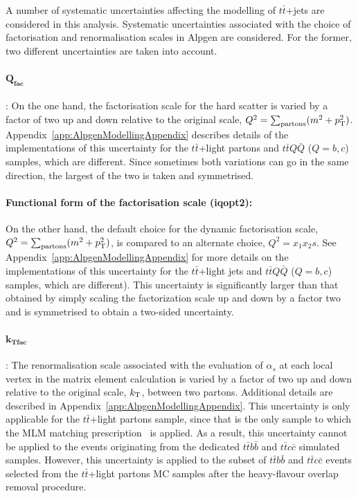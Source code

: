 A number of systematic uncertainties affecting 
the modelling of $t\bar{t}$+jets are considered
in this analysis. Systematic uncertainties associated 
with the choice of factorisation and renormalisation 
scales in {\sc Alpgen} are considered. For the former, 
two different uncertainties are taken into account.


\ifIsINT
\paragraph{$\mathbf{Q_{fac}}$}: 
\fi
On the one hand, the factorisation scale for the hard scatter is varied by a factor of two up and down relative to the
original scale, $Q^2=\sum_{\rm partons} (m^2 + \pt^2)$.
\ifIsINT 
Appendix~\ref{app:AlpgenModellingAppendix} describes details of the
implementations of this uncertainty for the $t\bar{t}$+light partons and $t\bar{t}Q\bar{Q}$ ($Q=b,c$) samples, which are different.
\fi
Since sometimes both variations can go in the same direction, the largest of the two is taken and symmetrised.
\ifIsINT
\paragraph{Functional form of the factorisation scale (iqopt2):} 
\fi
On the other hand, the default choice for the dynamic factorisation scale,
$Q^2=\sum_{\rm partons} (m^2 + \pt^2)$,  is compared to an alternate choice, $Q^2=x_1 x_2 s$.
\ifIsINT
See Appendix~\ref{app:AlpgenModellingAppendix} for more details on the implementations of this uncertainty 
for the $t\bar{t}$+light jets and $t\bar{t}Q\bar{Q}$ ($Q=b,c$) samples, which are different).
\fi
This uncertainty is significantly larger than that obtained by simply scaling the factorization scale up and down by a factor two 
and is symmetrised to obtain a two-sided uncertainty.

\ifIsINT
\paragraph{$\mathbf{k_{Tfac}}$}: 
\fi
The renormalisation scale associated with the evaluation of $\alpha_s$ at each local
vertex in the matrix element calculation is varied by a factor of two
up and down relative to the original scale, $k_{\rm T}$, between two
partons.  
\ifIsINT 
Additional details are described in Appendix~\ref{app:AlpgenModellingAppendix}.
\fi 
This uncertainty is only applicable for the $t\bar{t}$+light partons
sample, since that is the only sample to which the MLM matching prescription~\cite{mlm} is
applied. As a result, this uncertainty cannot be applied to the events 
originating from the dedicated $t\bar{t}b\bar{b}$ and $t\bar{t}c\bar{c}$
simulated samples. However, this uncertainty is applied to the subset of $t\bar{t}b\bar{b}$ and $t\bar{t}c\bar{c}$
events selected from the $t\bar{t}$+light partons MC samples after the
heavy-flavour overlap removal procedure.

